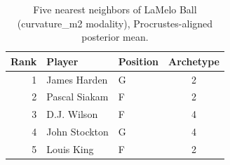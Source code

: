\begin{table}[htbp]
  \centering\small
  \begin{tabular}{rllc}
    \toprule
    Rank & Player & Position & Archetype \\
    \midrule
    1 & James Harden & G & 2 \\
    2 & Pascal Siakam & F & 2 \\
    3 & D.J. Wilson & F & 4 \\
    4 & John Stockton & G & 4 \\
    5 & Louis King & F & 2 \\
    \bottomrule
  \end{tabular}
  \caption{Five nearest neighbors of LaMelo Ball (curvature_m2 modality), Procrustes-aligned posterior mean.}
  \label{tab:LaMelo_Ball_neighbors_curvature_m2}
\end{table}

